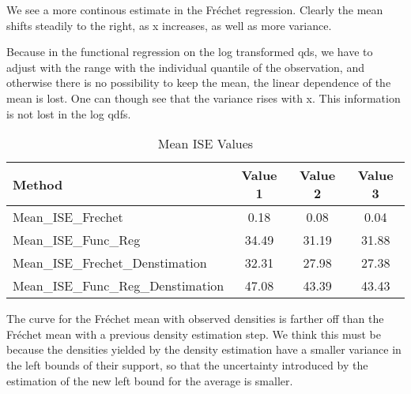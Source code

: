 We see a more continous estimate in the Fréchet regression. Clearly the mean shifts
steadily to the right, as x increases, as well as more variance.

Because in the functional regression on the log transformed qds, we have to adjust with
the range with the individual quantile of the observation, and otherwise there is no
possibility to keep the mean, the linear dependence of the mean is lost. One can though
see that the variance rises with x. This information is not lost in the log qdfs.

\begin{table}[h]
    \centering
    \begin{tabular}{lccc}
        \hline
        Method & Value 1 & Value 2 & Value 3 \\
        \hline
        Mean\_ISE\_Frechet & 0.18 & 0.08 & 0.04 \\
        Mean\_ISE\_Func\_Reg & 34.49 & 31.19 & 31.88 \\
        Mean\_ISE\_Frechet\_Denstimation & 32.31 & 27.98 & 27.38 \\
        Mean\_ISE\_Func\_Reg\_Denstimation & 47.08 & 43.39 & 43.43 \\
        \hline
    \end{tabular}
    \caption{Mean ISE Values}
\end{table}


The curve for the Fréchet mean with observed densities is farther off than the Fréchet
mean with a previous density estimation step. We think this must be because the densities
yielded by the density estimation have a smaller variance in the left bounds of their
support, so that the uncertainty introduced by the estimation of the new left bound for
the average is smaller.